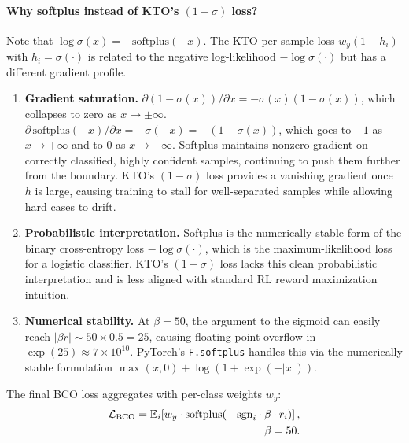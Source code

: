 \paragraph{Why softplus instead of KTO's $(1 - \sigma)$ loss?}
Note that $\log \sigma(x) = -\text{softplus}(-x)$.
The KTO per-sample loss $w_y(1 - h_i)$ with $h_i = \sigma(\cdot)$ is
related to the negative log-likelihood $-\log \sigma(\cdot)$ but has a
different gradient profile.

\begin{enumerate}[leftmargin=1.5em,itemsep=2pt]
  \item \textbf{Gradient saturation.}
  $\partial(1-\sigma(x))/\partial x = -\sigma(x)(1-\sigma(x))$, which
  collapses to zero as $x \to \pm\infty$.
  $\partial\,\mathrm{softplus}(-x)/\partial x = -\sigma(-x) = -(1-\sigma(x))$,
  which goes to $-1$ as $x \to +\infty$ and to $0$ as $x \to -\infty$.
  Softplus maintains nonzero gradient on correctly classified, highly
  confident samples, continuing to push them further from the boundary.
  KTO's $(1-\sigma)$ loss provides a vanishing gradient once $h$ is large,
  causing training to stall for well-separated samples while allowing
  hard cases to drift.

  \item \textbf{Probabilistic interpretation.}
  Softplus is the numerically stable form of the binary cross-entropy
  loss $-\log \sigma(\cdot)$, which is the maximum-likelihood loss for a
  logistic classifier.
  KTO's $(1-\sigma)$ loss lacks this clean probabilistic interpretation
  and is less aligned with standard RL reward maximization intuition.

  \item \textbf{Numerical stability.}
  At $\beta=50$, the argument to the sigmoid can easily reach $|\beta r|
  \sim 50 \times 0.5 = 25$, causing floating-point overflow in
  $\exp(25) \approx 7 \times 10^{10}$.
  PyTorch's \texttt{F.softplus} handles this via the numerically stable
  formulation $\max(x, 0) + \log(1 + \exp(-|x|))$.
\end{enumerate}

The final BCO loss aggregates with per-class weights $w_y$:
\begin{equation}
\begin{aligned}
    \mathcal{L}_\text{BCO} = \mathbb{E}_i\!\left[
    w_y \cdot \mathrm{softplus}(-\,\text{sgn}_i \cdot \beta \cdot r_i)
  \right], \\
  \quad \beta = 50.
  \notag
  \label{eq:bco_loss_final} 
\end{aligned}
\end{equation}


